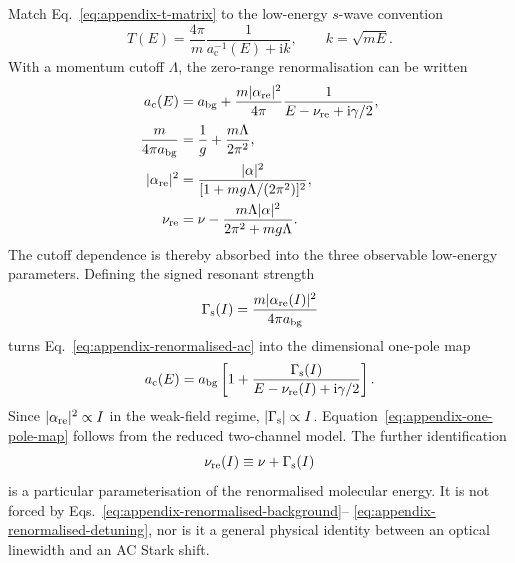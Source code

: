 \documentclass[9pt,a4paper,twocolumn,twoside]{rho-class/rho}
\newcommand{\ac}{a_{\mathrm{c}}}
\newcommand{\abg}{a_{\mathrm{bg}}}
\newcommand{\ii}{\mathrm{i}}
\begin{document}
        Match Eq.~\eqref{eq:appendix-t-matrix} to the low-energy $s$-wave
        convention
        \begin{equation}
            T(E)=\frac{4\pi}{m}
            \frac{1}{\ac^{-1}(E)+\ii k},
            \qquad k=\sqrt{mE}.
            \label{eq:appendix-low-energy-t}
        \end{equation}
        With a momentum cutoff $\Lambda$, the zero-range renormalisation can be
        written
        \begin{align}
            \ac(E)&=\abg+
            \frac{m|\alpha_{\rm re}|^2}{4\pi}
            \frac{1}{E-\nu_{\rm re}+\ii\gamma/2},
            \label{eq:appendix-renormalised-ac}\\
            \frac{m}{4\pi\abg}&=\frac{1}{g}+\frac{m\Lambda}{2\pi^2},
            \label{eq:appendix-renormalised-background}\\
            |\alpha_{\rm re}|^2&=
            \frac{|\alpha|^2}{[1+mg\Lambda/(2\pi^2)]^2},
            \label{eq:appendix-renormalised-coupling}\\
            \nu_{\rm re}&=\nu-
            \frac{m\Lambda|\alpha|^2}{2\pi^2+mg\Lambda}.
            \label{eq:appendix-renormalised-detuning}
        \end{align}
        The cutoff dependence is thereby absorbed into the three observable
        low-energy parameters.  Defining the signed resonant strength
        \begin{equation}
            \Gamma_{\rm s}(I)=
            \frac{m|\alpha_{\rm re}(I)|^2}{4\pi\abg}
            \label{eq:appendix-signed-gamma}
        \end{equation}
        turns Eq.~\eqref{eq:appendix-renormalised-ac} into the dimensional
        one-pole map
        \begin{equation}
            \ac(E)=\abg\left[1+
            \frac{\Gamma_{\rm s}(I)}
            {E-\nu_{\rm re}(I)+\ii\gamma/2}\right].
            \label{eq:appendix-one-pole-map}
        \end{equation}
        Since $|\alpha_{\rm re}|^2\propto I$ in the weak-field regime,
        $|\Gamma_{\rm s}|\propto I$.  Equation~\eqref{eq:appendix-one-pole-map}
        follows from the reduced two-channel model.  The further identification
        \begin{equation}
            \nu_{\rm re}(I)\equiv\nu+\Gamma_{\rm s}(I)
            \label{eq:appendix-tied-shift}
        \end{equation}
        is a particular parameterisation of the renormalised molecular energy.
        It is not forced by Eqs.~\eqref{eq:appendix-renormalised-background}--
        \eqref{eq:appendix-renormalised-detuning}, nor is it a general physical
        identity between an optical linewidth and an AC Stark shift.
\end{document}

